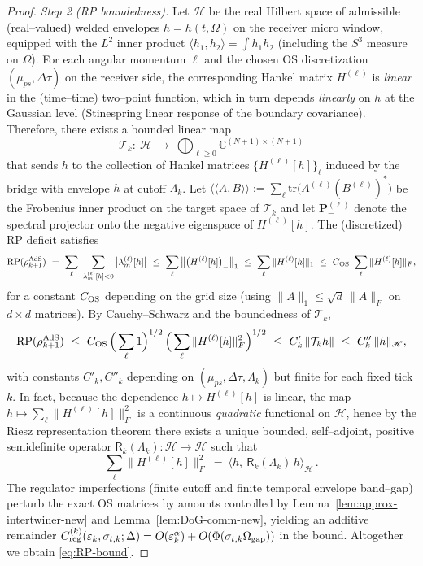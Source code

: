 \documentclass[10pt]{article}
\theoremstyle{definition}
\theoremstyle{plain}
\begin{document}
\begin{proof}
\bigskip
\emph{Step 2 (RP boundedness).}
Let $\mathscr H$ be the real Hilbert space of admissible (real--valued) welded envelopes $h=h(t,\Omega)$ on the receiver micro window, equipped with the $L^2$ inner product $\langle h_1,h_2\rangle=\int h_1 h_2$ (including the $S^3$ measure on $\Omega$). For each angular momentum $\ell$ and the chosen OS discretization $(\mu_{ps},\Delta\tau)$ on the receiver side, the corresponding Hankel matrix $H^{(\ell)}$ is \emph{linear} in the (time--time) two--point function, which in turn depends \emph{linearly} on $h$ at the Gaussian level (Stinespring linear response of the boundary covariance). Therefore, there exists a bounded linear map
\[
\mathcal T_k:\ \mathscr H\ \longrightarrow\ \bigoplus_{\ell\ge 0} \mathbb C^{(N+1)\times(N+1)}
\]
that sends $h$ to the collection of Hankel matrices $\{H^{(\ell)}[h]\}_\ell$ induced by the bridge with envelope $h$ at cutoff $\Lambda_k$. Let $\langle \!\langle A,B\rangle\!\rangle:=\sum_\ell \mathrm{tr}\!\big(A^{(\ell)} (B^{(\ell)})^\ast\big)$ be the Frobenius inner product on the target space of $\mathcal T_k$ and let $\mathbf P_-^{(\ell)}$ denote the spectral projector onto the negative eigenspace of $H^{(\ell)}[h]$. The (discretized) RP deficit satisfies
\[
\mathrm{RP}(\rho_{k+1}^{\rm AdS})\ =\ \sum_{\ell}\ \sum_{\lambda_m^{(\ell)}[h]<0}\big|\lambda_m^{(\ell)}[h]\big|
\ \le\ \sum_\ell \big\|\big(H^{(\ell)}[h]\big)_-\big\|_1
\ \le\ \sum_\ell \|H^{(\ell)}[h]\|_1
\ \le\ C_{\rm OS}\ \sum_\ell \|H^{(\ell)}[h]\|_F,
\]
for a constant $C_{\rm OS}$ depending on the grid size (using $\|A\|_1\le \sqrt{d}\,\|A\|_F$ on $d\times d$ matrices). By Cauchy--Schwarz and the boundedness of $\mathcal T_k$,
\[
\mathrm{RP}(\rho_{k+1}^{\rm AdS})
\ \le\ C_{\rm OS}\,\Big(\sum_\ell 1\Big)^{1/2}\,\Big(\sum_\ell \|H^{(\ell)}[h]\|_F^2\Big)^{1/2}
\ \le\ C'_k\,\|\mathcal T_k h\|\ \le\ C''_k\,\|h\|_{\mathscr H},
\]
with constants $C'_k,C''_k$ depending on $(\mu_{ps},\Delta\tau,\Lambda_k)$ but finite for each fixed tick $k$. In fact, because the dependence $h\mapsto H^{(\ell)}[h]$ is linear, the map $h\mapsto \sum_\ell \|H^{(\ell)}[h]\|_F^2$ is a continuous \emph{quadratic} functional on $\mathscr H$, hence by the Riesz representation theorem there exists a unique bounded, self--adjoint, positive semidefinite operator $\mathsf R_k(\Lambda_k):\mathscr H\to\mathscr H$ such that
\begin{equation}\label{eq:Rk-def}
\sum_\ell \|H^{(\ell)}[h]\|_F^2\ =\ \big\langle h,\ \mathsf R_k(\Lambda_k)\,h\big\rangle_{\mathscr H}\,.
\end{equation}
The regulator imperfections (finite cutoff and finite temporal envelope band--gap) perturb the exact OS matrices by amounts controlled by Lemma~\ref{lem:approx-intertwiner-new} and Lemma~\ref{lem:DoG-comm-new}, yielding an additive remainder $C_{\rm reg}^{(k)}(\varepsilon_k,\sigma_{t,k};\Delta)=O(\varepsilon_k^\alpha)+O(\Phi(\sigma_{t,k}\Omega_{\rm gap}))$ in the bound. Altogether we obtain \eqref{eq:RP-bound}.


\end{proof}
\end{document}
